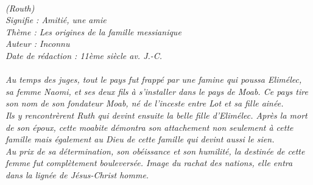 \BFont
\noindent\hrulefill
{\footnotesize
\textit{
\bigskip
{\centering{}
\\(Routh)
\\Signifie : Amitié, une amie
\\Thème : Les origines de la famille messianique
\\Auteur : Inconnu
\\Date de rédaction : 11ème siècle av. J.-C.\\}
}
\textit{
\\Au temps des juges, tout le pays fut frappé par une famine qui poussa Elimélec, sa femme Naomi, et ses deux fils à s’installer dans le pays de Moab. Ce pays tire son nom de son fondateur Moab, né de l’inceste entre Lot et sa fille ainée.
\\Ils y rencontrèrent Ruth qui devint ensuite la belle fille d’Elimélec. Après la mort de son époux, cette moabite démontra  son attachement non seulement à cette famille mais également au Dieu de cette famille qui devint aussi le sien.
\\Au prix de sa détermination, son obéissance et son humilité, la destinée de cette femme fut complètement bouleversée. Image du rachat des nations, elle entra dans la lignée de Jésus-Christ homme.\bigskip
}
}
\par\nobreak\noindent\hrulefill

